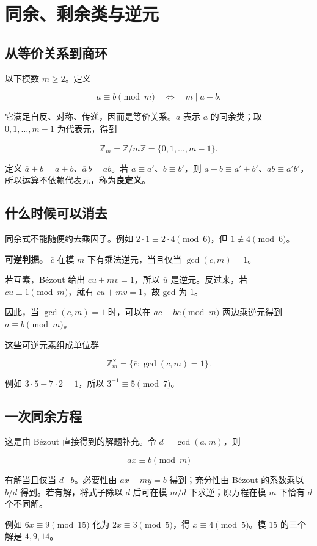 \section{同余、剩余类与逆元}


\subsection{从等价关系到商环}


以下模数 $m\ge2$。定义

\[
a\equiv b\pmod m\quad\Longleftrightarrow\quad m\mid a-b.
\]

它满足自反、对称、传递，因而是等价关系。$\overline a$ 表示 $a$ 的同余类；取 $0,1,\ldots,m-1$ 为代表元，得到

\[
\mathbb Z_m=\mathbb Z/m\mathbb Z=\{\overline0,\overline1,\ldots,\overline{m-1}\}.
\]

定义 $\overline a+\overline b=\overline{a+b}$、$\overline a\,\overline b=\overline{ab}$。若 $a\equiv a'$、$b\equiv b'$，则 $a+b\equiv a'+b'$、$ab\equiv a'b'$，所以运算不依赖代表元，称为\textbf{良定义}。

\subsection{什么时候可以消去}


同余式不能随便约去乘因子。例如 $2\cdot1\equiv2\cdot4\pmod6$，但 $1\not\equiv4\pmod6$。

\textbf{可逆判据。} $\overline c$ 在模 $m$ 下有乘法逆元，当且仅当 $\gcd(c,m)=1$。

若互素，Bézout 给出 $cu+mv=1$，所以 $\overline u$ 是逆元。反过来，若 $cu\equiv1\pmod m$，就有 $cu+mv=1$，故 gcd 为 $1$。

因此，当 $\gcd(c,m)=1$ 时，可以在 $ac\equiv bc\pmod m$ 两边乘逆元得到 $a\equiv b\pmod m$。

这些可逆元素组成单位群

\[
\mathbb Z_m^\times=\{\overline c:\gcd(c,m)=1\}.
\]

例如 $3\cdot5-7\cdot2=1$，所以 $3^{-1}\equiv5\pmod7$。

\subsection{一次同余方程}


这是由 Bézout 直接得到的解题补充。令 $d=\gcd(a,m)$，则

\[
ax\equiv b\pmod m
\]

有解当且仅当 $d\mid b$。必要性由 $ax-my=b$ 得到；充分性由 Bézout 的系数乘以 $b/d$ 得到。若有解，将式子除以 $d$ 后可在模 $m/d$ 下求逆；原方程在模 $m$ 下恰有 $d$ 个不同解。

例如 $6x\equiv9\pmod{15}$ 化为 $2x\equiv3\pmod5$，得 $x\equiv4\pmod5$。模 $15$ 的三个解是 $4,9,14$。
